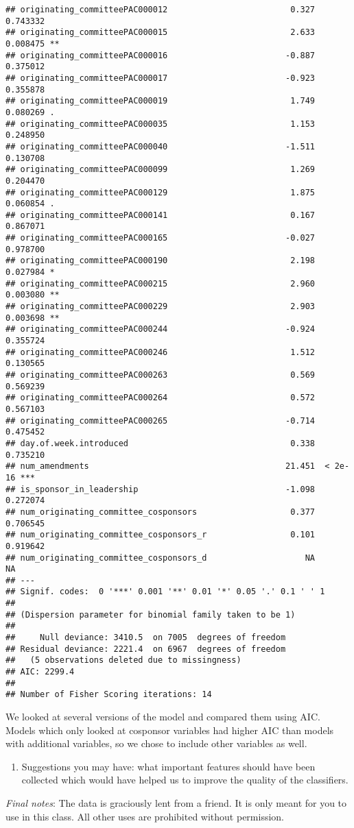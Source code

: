 \documentclass[]{article}
\providecommand{\tightlist}{%
  \setlength{\itemsep}{0pt}\setlength{\parskip}{0pt}}
\begin{document}
\begin{verbatim}
## originating_committeePAC000012                         0.327 0.743332    
## originating_committeePAC000015                         2.633 0.008475 ** 
## originating_committeePAC000016                        -0.887 0.375012    
## originating_committeePAC000017                        -0.923 0.355878    
## originating_committeePAC000019                         1.749 0.080269 .  
## originating_committeePAC000035                         1.153 0.248950    
## originating_committeePAC000040                        -1.511 0.130708    
## originating_committeePAC000099                         1.269 0.204470    
## originating_committeePAC000129                         1.875 0.060854 .  
## originating_committeePAC000141                         0.167 0.867071    
## originating_committeePAC000165                        -0.027 0.978700    
## originating_committeePAC000190                         2.198 0.027984 *  
## originating_committeePAC000215                         2.960 0.003080 ** 
## originating_committeePAC000229                         2.903 0.003698 ** 
## originating_committeePAC000244                        -0.924 0.355724    
## originating_committeePAC000246                         1.512 0.130565    
## originating_committeePAC000263                         0.569 0.569239    
## originating_committeePAC000264                         0.572 0.567103    
## originating_committeePAC000265                        -0.714 0.475452    
## day.of.week.introduced                                 0.338 0.735210    
## num_amendments                                        21.451  < 2e-16 ***
## is_sponsor_in_leadership                              -1.098 0.272074    
## num_originating_committee_cosponsors                   0.377 0.706545    
## num_originating_committee_cosponsors_r                 0.101 0.919642    
## num_originating_committee_cosponsors_d                    NA       NA    
## ---
## Signif. codes:  0 '***' 0.001 '**' 0.01 '*' 0.05 '.' 0.1 ' ' 1
## 
## (Dispersion parameter for binomial family taken to be 1)
## 
##     Null deviance: 3410.5  on 7005  degrees of freedom
## Residual deviance: 2221.4  on 6967  degrees of freedom
##   (5 observations deleted due to missingness)
## AIC: 2299.4
## 
## Number of Fisher Scoring iterations: 14
\end{verbatim}

We looked at several versions of the model and compared them using AIC.
Models which only looked at cosponsor variables had higher AIC than
models with additional variables, so we chose to include other variables
as well.

\begin{enumerate}
\def\labelenumi{\arabic{enumi}.}
\setcounter{enumi}{3}
\tightlist
\item
  Suggestions you may have: what important features should have been
  collected which would have helped us to improve the quality of the
  classifiers.
\end{enumerate}

\emph{Final notes}: The data is graciously lent from a friend. It is
only meant for you to use in this class. All other uses are prohibited
without permission.
\end{document}
